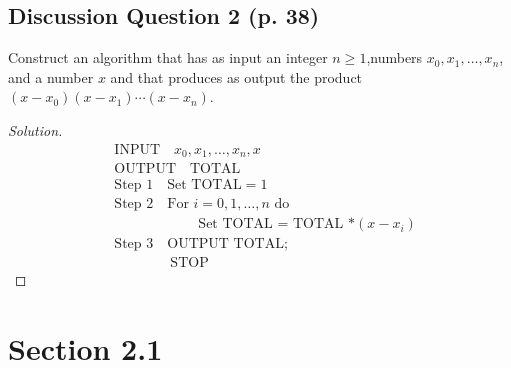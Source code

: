 \documentclass{article}
\begin{document}
\subsection*{Discussion Question 2 (p. 38)}
Construct an algorithm that has as input an integer $n \ge 1$,numbers $x_0,x_1,\dots,x_n$, and 
a number $x$ and that produces as output the product $(x-x_0)(x-x_1)\cdots(x-x_n)$.
\begin{proof}[Solution]
    \begin{align*}
        & \text{INPUT} \quad x_0, x_1, \dots, x_n, x \\
        & \text{OUTPUT} \quad \text{TOTAL} \\
        & \text{Step 1} \quad \text{Set } \text{TOTAL} = 1 \\
        & \text{Step 2} \quad \text{For } i = 0, 1, \dots, n \text{ do} \\
        & \qquad\qquad\qquad \text{Set TOTAL = TOTAL *} (x - x_i) \\
        & \text{Step 3} \quad \text{OUTPUT TOTAL;} \\
        & \qquad\qquad \text{STOP}
    \end{align*}
\end{proof}

\newpage
\section*{Section 2.1}
\end{document}

